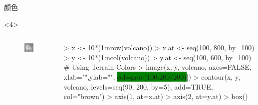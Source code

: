 \documentclass{beamerthemeMono}
\begin{document}
\begin{frame}[t,fragile]{\subsecname}{颜色}
\begin{overlayarea}{\textwidth}{\textheight}
\begin{onlyenv}<4>
  \begin{columns}
    \begin{column}{.4\textwidth}
\centering
\begin{figure}
  \includegraphics[width=\columnwidth]{gray_colors.png}
\end{figure}
    \end{column}

    \begin{column}{.6\textwidth}
\centering
\begin{rcode}
> x <- 10*(1:nrow(volcano))
> x.at <- seq(100, 800, by=100)
> y <- 10*(1:ncol(volcano))
> y.at <- seq(100, 600, by=100)
# Using Terrain Colors 
> image(x, y, volcano, axes=FALSE, xlab="",ylab="",|\colorbox{green}{col=gray(100:200/200)}|)
> contour(x, y, volcano, levels=seq(90, 200, by=5), add=TRUE, col="brown")
> axis(1, at=x.at)
> axis(2, at=y.at)
> box()
\end{rcode}
    \end{column}
  \end{columns}
\end{onlyenv}

\end{overlayarea}  
\end{frame}
\end{document}
